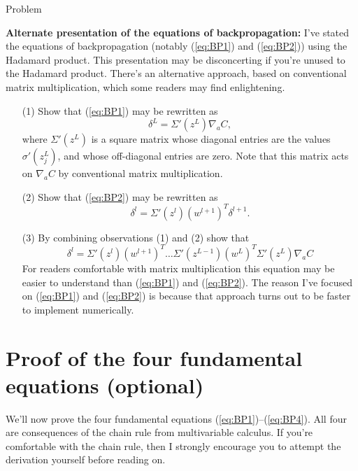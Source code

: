 \documentclass[a4paper,twoside,10pt]{book}
\begin{document}
\begin{exercize}{Problem}
	\item \textbf{Alternate presentation of the equations of backpropagation:} I've stated the equations of backpropagation (notably (\ref{eq:BP1}) and (\ref{eq:BP2})) using the Hadamard product. This presentation may be disconcerting if you're unused to the Hadamard product. There's an alternative approach, based on conventional matrix multiplication, which some readers may find enlightening.
	\begin{enumerate}
		\item[(1)]  Show that (\ref{eq:BP1}) may be rewritten as
		\begin{equation}
			\delta^L = \Sigma'(z^L) \nabla_a C,
			\tag{33}\label{eq:33}
		\end{equation}
		where $\Sigma'(z^L)$ is a square matrix whose diagonal entries are the values $\sigma'(z^L_j)$, and whose off-diagonal entries are zero. Note that this matrix acts on $\nabla_a C$ by conventional matrix multiplication.
		\item[(2)] Show that (\ref{eq:BP2}) may be rewritten as
		\begin{equation}
			\delta^l = \Sigma'(z^l) (w^{l+1})^T \delta^{l+1}.
			\tag{34}\label{eq:34}
		\end{equation}
		\item[(3)] By combining observations (1) and (2) show that
		\begin{equation}
			\delta^l = \Sigma'(z^l) (w^{l+1})^T \ldots \Sigma'(z^{L-1}) (w^L)^T \Sigma'(z^L) \nabla_a C
			\tag{35}\label{eq:35}
		\end{equation}
		For readers comfortable with matrix multiplication this equation may be easier to understand than (\ref{eq:BP1}) and (\ref{eq:BP2}). The reason I've focused on (\ref{eq:BP1}) and (\ref{eq:BP2}) is because that approach turns out to be faster to implement numerically.
	\end{enumerate}
\end{exercize}
\section{Proof of the four fundamental equations (optional)}
\label{sec:2.5}
We'll now prove the four fundamental equations (\ref{eq:BP1})--(\ref{eq:BP4}). All four are consequences of the chain rule from multivariable calculus. If you're comfortable with the chain rule, then I strongly encourage you to attempt the derivation yourself before reading on.
\end{document}
